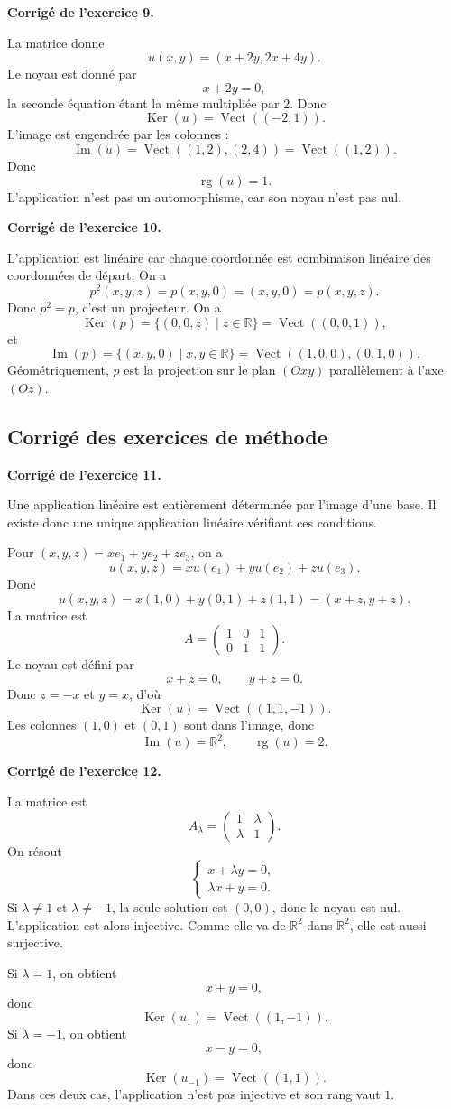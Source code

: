 \documentclass[11pt,a4paper]{article}
\newcommand{\corr}[1]{
    \vspace{0.4cm}
    \noindent\textbf{\textcolor{blue!60!black}{Corrigé de l'exercice #1.}}
    \par\vspace{0.1cm}
}
\newcommand{\Ker}{\operatorname{Ker}}
\newcommand{\Img}{\operatorname{Im}}
\newcommand{\rg}{\operatorname{rg}}
\newcommand{\Vect}{\operatorname{Vect}}
\begin{document}
\corr{9}
La matrice donne
\[
u(x,y)=(x+2y,2x+4y).
\]
Le noyau est donné par
\[
x+2y=0,
\]
la seconde équation étant la même multipliée par $2$. Donc
\[
\Ker(u)=\Vect((-2,1)).
\]
L'image est engendrée par les colonnes :
\[
\Img(u)=\Vect((1,2),(2,4))=\Vect((1,2)).
\]
Donc
\[
\rg(u)=1.
\]
L'application n'est pas un automorphisme, car son noyau n'est pas nul.

\corr{10}
L'application est linéaire car chaque coordonnée est combinaison linéaire des coordonnées de départ. On a
\[
p^2(x,y,z)=p(x,y,0)=(x,y,0)=p(x,y,z).
\]
Donc $p^2=p$, c'est un projecteur. On a
\[
\Ker(p)=\{(0,0,z)\mid z\in\mathbb{R}\}=\Vect((0,0,1)),
\]
et
\[
\Img(p)=\{(x,y,0)\mid x,y\in\mathbb{R}\}=\Vect((1,0,0),(0,1,0)).
\]
Géométriquement, $p$ est la projection sur le plan $(Oxy)$ parallèlement à l'axe $(Oz)$.

\subsection{Corrigé des exercices de méthode}

\corr{11}
Une application linéaire est entièrement déterminée par l'image d'une base. Il existe donc une unique application linéaire vérifiant ces conditions.

Pour $(x,y,z)=xe_1+ye_2+ze_3$, on a
\[
u(x,y,z)=xu(e_1)+yu(e_2)+zu(e_3).
\]
Donc
\[
u(x,y,z)=x(1,0)+y(0,1)+z(1,1)=(x+z,y+z).
\]
La matrice est
\[
A=
\begin{pmatrix}
1&0&1\\
0&1&1
\end{pmatrix}.
\]
Le noyau est défini par
\[
x+z=0,\qquad y+z=0.
\]
Donc $z=-x$ et $y=x$, d'où
\[
\Ker(u)=\Vect((1,1,-1)).
\]
Les colonnes $(1,0)$ et $(0,1)$ sont dans l'image, donc
\[
\Img(u)=\mathbb{R}^2,
\qquad
\rg(u)=2.
\]

\corr{12}
La matrice est
\[
A_\lambda=
\begin{pmatrix}
1&\lambda\\
\lambda&1
\end{pmatrix}.
\]
On résout
\[
\begin{cases}
x+\lambda y=0,\\
\lambda x+y=0.
\end{cases}
\]
Si $\lambda\neq 1$ et $\lambda\neq -1$, la seule solution est $(0,0)$, donc le noyau est nul. L'application est alors injective. Comme elle va de $\mathbb{R}^2$ dans $\mathbb{R}^2$, elle est aussi surjective.

Si $\lambda=1$, on obtient
\[
x+y=0,
\]
donc
\[
\Ker(u_1)=\Vect((1,-1)).
\]
Si $\lambda=-1$, on obtient
\[
x-y=0,
\]
donc
\[
\Ker(u_{-1})=\Vect((1,1)).
\]
Dans ces deux cas, l'application n'est pas injective et son rang vaut $1$.
\end{document}
